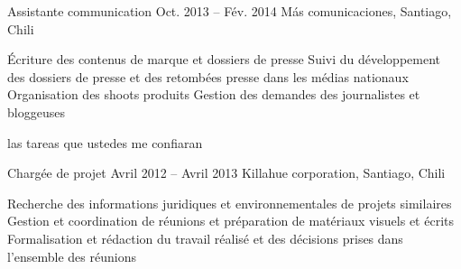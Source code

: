 \begin{joblist}
{		%
	}


\vspace{-0.2cm}
\item[Assistante communication]{Oct. 2013 -- Fév. 2014 }     
  	{Más comunicaciones, Santiago, Chili}     
  	{
			\vspace{-0.5cm}
		\iftbftiny \setlength{\parskip}{-10pt} \fi
		\begin{itemize}
			  \iftbftiny \setlength\itemsep{-3pt} \fi
			  \cvitem[\checkmark]  Écriture des contenus de marque et dossiers de presse                                        
			  \cvitem[\checkmark]  Suivi du développement des dossiers de presse et des retombées presse dans les médias nationaux                                             
			  \cvitem[\checkmark]  Organisation des shoots produits 
			  \cvitem[\checkmark]  Gestion des demandes des journalistes et bloggeuses 

		\end{itemize}       
	}las tareas que ustedes me confiaran 



\vspace{-0.2cm}
\item[Chargée de projet]{Avril 2012 -- Avril 2013 }     
	{Killahue corporation, Santiago, Chili}     
	{
			\vspace{-0.5cm}			 
		\iftbftiny \setlength{\parskip}{-10pt} \fi
		\begin{itemize}
			  \iftbftiny \setlength\itemsep{-3pt} \fi
			  \cvitem[\checkmark] Recherche des informations juridiques et environnementales de projets similaires          
			  \cvitem[\checkmark] Gestion et coordination de réunions et préparation de matériaux visuels et écrits   
			  \cvitem[\checkmark] Formalisation et rédaction du travail réalisé et des décisions prises dans l’ensemble des réunions     
		\end{itemize}      

}
\end{joblist}

